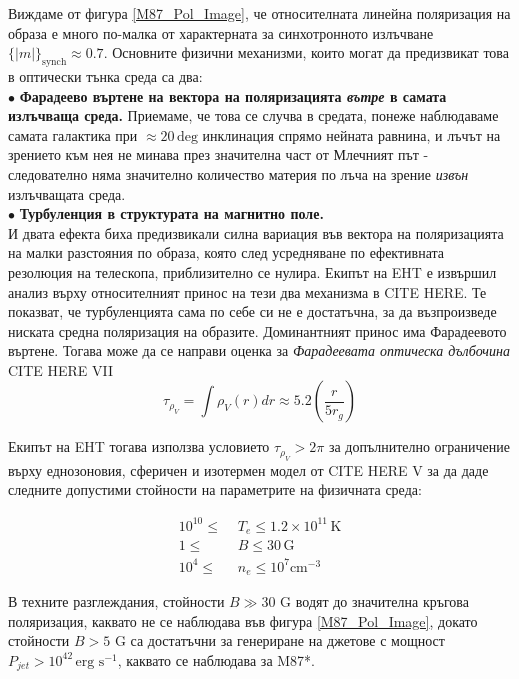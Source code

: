  Виждаме от фигура \ref{M87_Pol_Image}, че относителната линейна поляризация на образа е много по-малка от характерната за синхотронното излъчване $\lbrace |m| \rbrace_\text{synch}\approx 0.7$. Основните физични механизми, които могат да предизвикат това в оптически тънка среда са два:\\\newline
 $\bullet$ \textbf{Фарадеево въртене на вектора на поляризацията \emph{вътре} в самата излъчваща среда.} Приемаме, че това се случва в средата, понеже наблюдаваме самата галактика при $\approx 20\,\text{deg}$ инклинация спрямо нейната равнина, и лъчът на зрението към нея не минава през значителна част от Млечният път - следователно няма значително количество материя по лъча на зрение \emph{извън} излъчващата среда.\\
 $\bullet$ \textbf{Турбуленция в структурата на магнитно поле.}\\\newline
И двата ефекта биха предизвикали силна вариация във вектора на поляризацията на малки разстояния по образа, която след усредняване по ефективната резолюция на телескопа, приблизително се нулира. Екипът на EHT е извършил анализ върху относителният принос на тези два механизма в CITE HERE. Те показват, че турбуленцията сама по себе си не е достатъчна, за да възпроизведе ниската средна поляризация на образите. Доминантният принос има Фарадеевото въртене. Тогава може да се направи оценка за \emph{Фарадеевата оптическа дълбочина} CITE HERE VII
\begin{equation}
	\tau_{\rho_V} = \int \rho_{V}(r)dr\approx 5.2\left(\frac{r}{5r_g}\right)
\end{equation}
\lfoot{}

Екипът на EHT тогава използва условието $\tau_{\rho_V}>2\pi$ за допълнително ограничение върху еднозоновия, сферичен и изотермен модел от CITE HERE V за да даде следните допустими стойности на параметрите на физичната среда:

\begin{equation}
	\begin{split}
		10^{10} \le\,\, &T_e \le 1.2 \times 10^{11}\,\text{K}\\
		1 \le\,\, &B \le 30\, \text{G}\\
		10^4 \le\,\, &n_e \le 10^7 \text{cm}^{-3}
	\end{split}
\end{equation}

В техните разглеждания, стойности $B \gg 30$ G водят до значителна кръгова поляризация, каквато не се наблюдава във фигура \ref{M87_Pol_Image}, докато стойности $B > 5$ G са достатъчни за генериране на джетове с мощност $P_{jet} > 10^{42}\,\text{erg s}^{-1}$, каквато се наблюдава за M87*.\\

